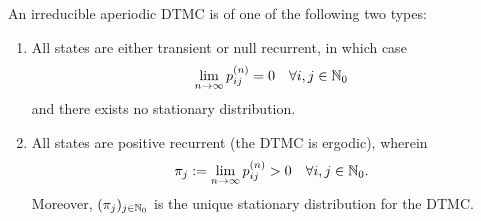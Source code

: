 \documentclass[a4paper,10pt,english]{article}
\begin{document}
\begin{thm}
  An irreducible aperiodic DTMC is of one of the following two types:
\begin{enumerate}
	\item All states are either transient or null recurrent, in which case \begin{align*}\lim_{n \to \infty} p_{ij}^{(n)} = 0 \quad \forall i,j \in \mathbb{N}_0\end{align*} and there exists no stationary distribution.
	\item All states are positive recurrent (the DTMC is ergodic), wherein
          \begin{align*} \pi_j := \lim_{n \to \infty} p_{ij}^{(n)} > 0 \quad
          \forall i,j \in \mathbb{N}_0.\end{align*}
          Moreover, $(\pi_j)_{j \in \mathbb{N}_0}$ is the unique stationary
          distribution for the DTMC.
\end{enumerate}
\end{thm}
\end{document}
